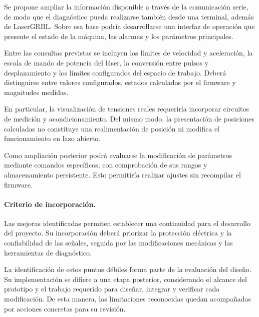 \documentclass[blue,fullpaper]{ludusofficial}  %
\begin{document}
Se propone ampliar la información disponible
a través de la comunicación serie, de modo
que el diagnóstico pueda realizarse también
desde una terminal, además de LaserGRBL.
Sobre esa base podría desarrollarse una
interfaz de operación que presente el estado
de la máquina, las alarmas y los parámetros
principales.

Entre las consultas previstas se incluyen
los límites de velocidad y aceleración,
la escala de mando de potencia del láser,
la conversión entre pulsos y desplazamiento
y los límites configurados del espacio
de trabajo. Deberá distinguirse entre
valores configurados, estados calculados
por el firmware y magnitudes medidas.

En particular, la visualización de tensiones
reales requeriría incorporar circuitos de
medición y acondicionamiento. Del mismo modo,
la presentación de posiciones calculadas
no constituye una realimentación de posición
ni modifica el funcionamiento en lazo abierto.

Como ampliación posterior podrá evaluarse
la modificación de parámetros mediante
comandos específicos, con comprobación
de sus rangos y almacenamiento persistente.
Esto permitiría realizar ajustes sin
recompilar el firmware.

\paragraph{Criterio de incorporación.}

Las mejoras identificadas permiten establecer
una continuidad para el desarrollo del proyecto.
Su incorporación deberá priorizar la protección
eléctrica y la confiabilidad de las señales,
seguida por las modificaciones mecánicas
y las herramientas de diagnóstico.

La identificación de estos puntos débiles
forma parte de la evaluación del diseño.
Su implementación se difiere a una etapa
posterior, considerando el alcance del
prototipo y el trabajo requerido para
diseñar, integrar y verificar cada modificación.
De esta manera, las limitaciones reconocidas
quedan acompañadas por acciones concretas
para su revisión.


\clearpage


\end{document}

